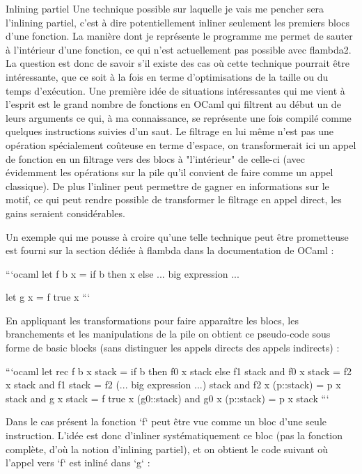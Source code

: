 \documentclass{beamer}
\begin{document}
\begin{frame}{Inlining partiel}
    Une technique possible sur laquelle je vais me pencher sera l'inlining partiel, c'est à dire potentiellement inliner seulement les premiers blocs d'une fonction. La manière dont je représente le programme me permet de sauter à l'intérieur d'une fonction, ce qui n'est actuellement pas possible avec flambda2. La question est donc de savoir s'il existe des cas où cette technique pourrait être intéressante, que ce soit à la fois en terme d'optimisations de la taille ou du temps d’exécution. Une première idée de situations intéressantes qui me vient à l'esprit est le grand nombre de fonctions en OCaml qui filtrent au début un de leurs arguments ce qui, à ma connaissance, se représente une fois compilé comme quelques instructions suivies d'un saut. Le filtrage en lui même n'est pas une opération spécialement coûteuse en terme d'espace, on transformerait ici un appel de fonction en un filtrage vers des blocs à "l'intérieur" de celle-ci (avec évidemment les opérations sur la pile qu'il convient de faire comme un appel classique). De plus l'inliner peut permettre de gagner en informations sur le motif, ce qui peut rendre possible de transformer le filtrage en appel direct, les gains seraient considérables.

    Un exemple qui me pousse à croire qu'une telle technique peut être prometteuse est fourni sur la section dédiée à flambda dans la documentation de OCaml :
    
    ```ocaml
    let f b x =
      if b then x else ... big expression ...
    
    let g x = f true x
    ```
    
    En appliquant les transformations pour faire apparaître les blocs, les branchements et les manipulations de la pile on obtient ce pseudo-code sous forme de basic blocks (sans distinguer les appels directs des appels indirects) :
    
    ```ocaml
    let rec f b x stack =
      if b then f0 x stack else f1 stack
    and f0 x stack =
      f2 x stack
    and f1 stack =
      f2 (... big expression ...) stack
    and f2 x (p::stack) =
      p x stack
    and g x stack =
      f true x (g0::stack)
    and g0 x (p::stack) =
      p x stack
    ```
    
    Dans le cas présent la fonction `f` peut être vue comme un bloc d'une seule instruction. L'idée est donc d'inliner systématiquement ce bloc (pas la fonction complète, d'où la notion d'inlining partiel), et on obtient le code suivant où l'appel vers `f` est inliné dans `g` :
    

\end{frame}
\end{document}
